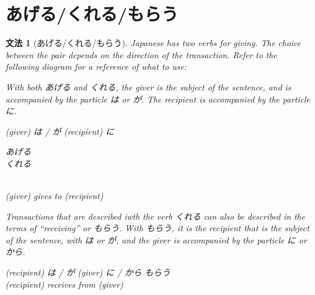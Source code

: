 \documentclass[notoc,notitlepage]{tufte-book}
\newenvironment{lrcases}
  {\left\lbrace\quad\begin{aligned}}
  {\end{aligned}\quad\right\rbrace}
\newtheorem{grammar}{文法}[section]
\begin{document}

\section{あげる/くれる/もらう}%
\label{sec:ageru_kureru_morau}

\begin{grammar}[あげる/くれる/もらう]
\label{grammar:ageru_kureru_morau}
  Japanese has two verbs for giving. The choice between the pair depends on the direction of the transaction. Refer to the following diagram for a reference of what to use:
  \begin{center}
  \end{center}
  With both あげる and くれる, the giver is the subject of the sentence, and is accompanied by the particle は or が. The recipient is accompanied by the particle に.
  \begin{center}
    (giver) は / が (recipient) に \begin{lrcases}あげる \\ くれる \end{lrcases} \\
    (giver) gives to (recipient)
  \end{center}
  Transactions that are described iwth the verb くれる can also be described in the terms of ``receiving'' or もらう. With もらう, it is the recipient that is the subject of the sentence, with は or が, and the giver is accompanied by the particle に or から.
  \begin{center}
    (recipient) は / が (giver) に / から もらう \\
    (recipient) receives from (giver)
  \end{center}
\end{grammar}
\end{document}
